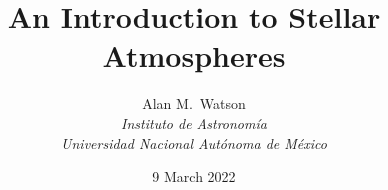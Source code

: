 
\date{9 March 2022}

\title{\Huge\bfseries An Introduction to Stellar Atmospheres}

\author{
\Large Alan M.\ Watson\\[0.5\baselineskip]
\Large \itshape Instituto de Astronomía\\[0.2\baselineskip]
\Large \itshape Universidad Nacional Autónoma de México
}

\maketitle


